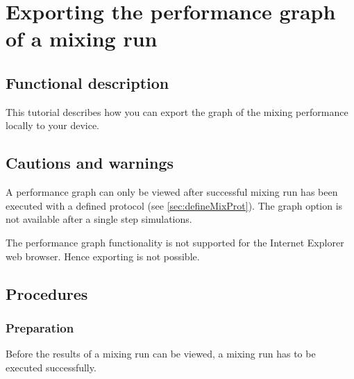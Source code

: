 
\section{Exporting the performance graph of a mixing run}
\label{sec:exportSingleGraph}

\subsection{Functional description}
This tutorial describes how you can export the graph of the mixing performance locally to your device.

\subsection{Cautions and warnings}
A performance graph can only be viewed after successful mixing run has been executed with a defined protocol (see \ref{sec:defineMixProt}). The graph option is not available after a single step simulations.

The performance graph functionality is not supported for the Internet Explorer web browser. Hence exporting is not possible.

\subsection{Procedures}
\subsubsection{Preparation}
Before the results of a mixing run can be viewed, a mixing run has to be executed successfully.

